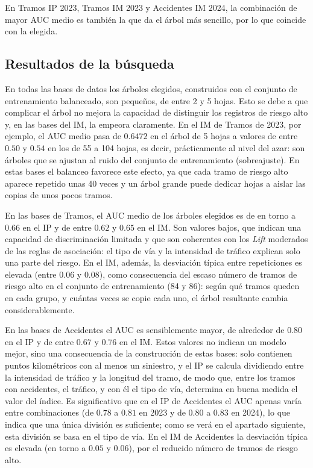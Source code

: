 \documentclass[twoside,a4paper,12pt,onecolumn,openany]{book}
\begin{document}
En Tramos IP 2023, Tramos IM 2023 y Accidentes IM 2024, la combinación de mayor AUC medio es también la que da el árbol más sencillo, por lo que coincide con la elegida.
 
\subsection{Resultados de la búsqueda}
 
En todas las bases de datos los árboles elegidos, construidos con el conjunto de entrenamiento balanceado, son pequeños, de entre 2 y 5 hojas. Esto se debe a que complicar el árbol no mejora la capacidad de distinguir los registros de riesgo alto y, en las bases del IM, la empeora claramente. En el IM de Tramos de 2023, por ejemplo, el AUC medio pasa de $0.6472$ en el árbol de 5 hojas a valores de entre $0.50$ y $0.54$ en los de 55 a 104 hojas, es decir, prácticamente al nivel del azar: son árboles que se ajustan al ruido del conjunto de entrenamiento (sobreajuste). En estas bases el balanceo favorece este efecto, ya que cada tramo de riesgo alto aparece repetido unas 40 veces y un árbol grande puede dedicar hojas a aislar las copias de unos pocos tramos.
 
\vspace{0.5cm}
 
En las bases de Tramos, el AUC medio de los árboles elegidos es de en torno a $0.66$ en el IP y de entre $0.62$ y $0.65$ en el IM. Son valores bajos, que indican una capacidad de discriminación limitada y que son coherentes con los \textit{Lift} moderados de las reglas de asociación: el tipo de vía y la intensidad de tráfico explican solo una parte del riesgo. En el IM, además, la desviación típica entre repeticiones es elevada (entre $0.06$ y $0.08$), como consecuencia del escaso número de tramos de riesgo alto en el conjunto de entrenamiento (84 y 86): según qué tramos queden en cada grupo, y cuántas veces se copie cada uno, el árbol resultante cambia considerablemente.
 
\vspace{0.5cm}
 
En las bases de Accidentes el AUC es sensiblemente mayor, de alrededor de $0.80$ en el IP y de entre $0.67$ y $0.76$ en el IM. Estos valores no indican un modelo mejor, sino una consecuencia de la construcción de estas bases: solo contienen puntos kilométricos con al menos un siniestro, y el IP se calcula dividiendo entre la intensidad de tráfico y la longitud del tramo, de modo que, entre los tramos con accidentes, el tráfico, y con él el tipo de vía, determina en buena medida el valor del índice. Es significativo que en el IP de Accidentes el AUC apenas varía entre combinaciones (de $0.78$ a $0.81$ en 2023 y de $0.80$ a $0.83$ en 2024), lo que indica que una única división es suficiente; como se verá en el apartado siguiente, esta división se basa en el tipo de vía. En el IM de Accidentes la desviación típica es elevada (en torno a $0.05$ y $0.06$), por el reducido número de tramos de riesgo alto.
 
\end{document}
